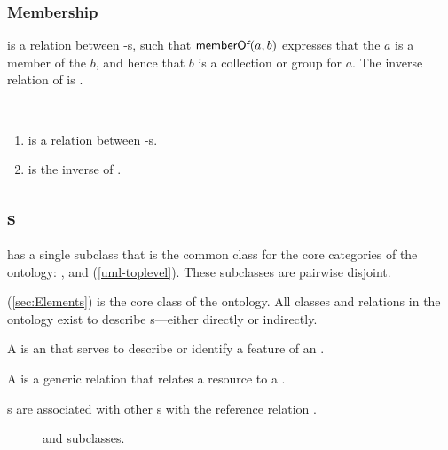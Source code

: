\subsubsection{Membership}
\label{sec:membership}

 is a relation between -s,
such that $\textsf{memberOf}(a,b)$ expresses that the  $a$ is a member of the  $b$,
and hence that $b$ is a collection or group for $a$.
The inverse relation of  is .

\begin{axioms}~
  \begin{enumerate}[resume=axioms,{label=(\arabic*)}]
  \item {} is a relation between -s.
  \item {} is the inverse of .
  \end{enumerate}
\end{axioms}

\subsection{s}

 has a single subclass  that is the common class for the core categories of the ontology:
,  and  (\autoref{uml-toplevel}).
These subclasses are pairwise disjoint.

 (\autoref{sec:Elements}) is the core class of the ontology. All classes and
relations in the ontology exist to describe s---either directly or indirectly.

A  is an  that serves to describe or identify a feature of an .

A  is a generic relation that relates a resource to a .

s are associated with other s with the reference relation .

\begin{figure}
  \centering
  
  \caption{\label{uml-toplevel}
     and subclasses.}
\end{figure}


